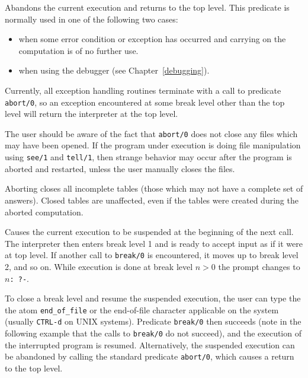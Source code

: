 \begin{description}

    Abandons the current execution and returns to the top level.  This
    predicate is normally used in one of the following two cases: 
    \begin{itemize} 
    \item when some error condition or exception has occurred and carrying
	  on the computation is of no further use.
    \item when using the debugger (see Chapter~\ref{debugging}).  
    \end{itemize}
    Currently, all exception handling routines terminate with a call to 
    predicate {\tt abort/0}, so an exception encountered at some break level 
    other than the top level will return the interpreter at the top level.

    The user should be aware of the fact that {\tt abort/0} does not close 
    any files which may have been opened.  If the program under execution is 
    doing file manipulation using {\tt see/1} and {\tt tell/1}, then strange 
    behavior may occur after the program is aborted and restarted, unless
    the user manually closes the files.

    Aborting closes all incomplete tables (those which may not have a 
    complete set of answers).  Closed tables are unaffected, even if 
    the tables were created during the aborted computation.

    Causes the current execution to be suspended at the beginning of the next 
    call.  The interpreter then enters break level 1 and is ready to accept
    input as if it were at top level.  If another call to {\tt break/0} is 
    encountered, it moves up to break level 2, and so on.  While execution 
    is done at break level $n>0$ the prompt changes to {\tt $n$: ?-}.

    To close a break level and resume the suspended execution, the user can 
    type the the atom {\tt end\_of\_file} or the end-of-file character 
    applicable on the system (usually {\tt CTRL-d} on UNIX systems).  
    Predicate {\tt break/0} 
    then succeeds (note in the following example that the calls to {\tt break/0}
    do not succeed), and the execution of the interrupted program is resumed.  
    Alternatively, the suspended execution can be abandoned by calling the 
    standard predicate {\tt abort/0}, which causes a return to the top level.


\end{description}
